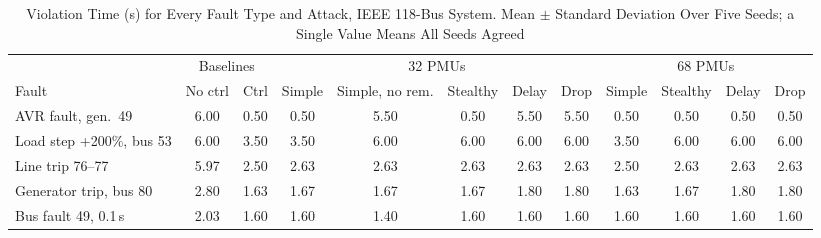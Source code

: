 \begin{table}[t]
\caption{Violation Time (s) for Every Fault Type and Attack, IEEE 118-Bus System. Mean $\pm$ Standard Deviation Over Five Seeds; a Single Value Means All Seeds Agreed}
\label{tab:faults}
\centering
\footnotesize
\setlength{\tabcolsep}{3.2pt}
\begin{tabular}{@{}lccccccccccc@{}}
\toprule
 & \multicolumn{2}{c}{Baselines} & \multicolumn{5}{c}{32 PMUs} & \multicolumn{4}{c}{68 PMUs} \\
\cmidrule(lr){2-3}\cmidrule(lr){4-8}\cmidrule(l){9-12}
Fault & No ctrl & Ctrl & Simple & Simple, no rem. & Stealthy & Delay & Drop & Simple & Stealthy & Delay & Drop \\
\midrule
AVR fault, gen.~49 & 6.00 & 0.50 & 0.50 & 5.50 & 0.50 & 5.50 & 5.50 & 0.50 & 0.50 & 0.50 & 0.50 \\
Load step +200\%, bus 53 & 6.00 & 3.50 & 3.50 & 6.00 & 6.00 & 6.00 & 6.00 & 3.50 & 6.00 & 6.00 & 6.00 \\
Line trip 76--77 & 5.97 & 2.50 & 2.63 & 2.63 & 2.63 & 2.63 & 2.63 & 2.50 & 2.63 & 2.63 & 2.63 \\
Generator trip, bus 80 & 2.80 & 1.63 & 1.67 & 1.67 & 1.67 & 1.80 & 1.80 & 1.63 & 1.67 & 1.80 & 1.80 \\
Bus fault 49, 0.1\,s & 2.03 & 1.60 & 1.60 & 1.40 & 1.60 & 1.60 & 1.60 & 1.60 & 1.60 & 1.60 & 1.60 \\
\bottomrule
\end{tabular}
\end{table}

